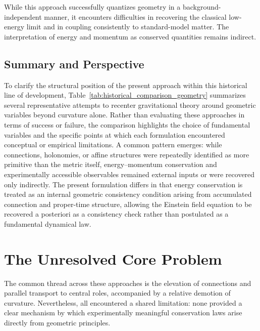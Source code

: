 \documentclass[%
 reprint,
 amsmath,amssymb,
 aps,
 prb,
]{revtex4-2}
\numberwithin{equation}{section}
\begin{document}
While this approach successfully quantizes geometry in a background-independent manner, it encounters difficulties in recovering the classical low-energy limit and in coupling consistently to standard-model matter. The interpretation of energy and momentum as conserved quantities remains indirect.

\subsection{Summary and Perspective}
\label{sec:historical_summary}

To clarify the structural position of the present approach within this historical line of development, Table~\ref{tab:historical_comparison_geometry} summarizes several representative attempts to recenter gravitational theory around geometric variables beyond curvature alone. Rather than evaluating these approaches in terms of success or failure, the comparison highlights the choice of fundamental variables and the specific points at which each formulation encountered conceptual or empirical limitations. A common pattern emerges: while connections, holonomies, or affine structures were repeatedly identified as more primitive than the metric itself, energy--momentum conservation and experimentally accessible observables remained external inputs or were recovered only indirectly. The present formulation differs in that energy conservation is treated as an internal geometric consistency condition arising from accumulated connection and proper-time structure, allowing the Einstein field equation to be recovered a posteriori as a consistency check rather than postulated as a fundamental dynamical law.

\section{The Unresolved Core Problem}
\label{sec:core_problem}

The common thread across these approaches is the elevation of connections and parallel transport to central roles, accompanied by a relative demotion of curvature. Nevertheless, all encountered a shared limitation: none provided a clear mechanism by which experimentally meaningful conservation laws arise directly from geometric principles.
\end{document}
